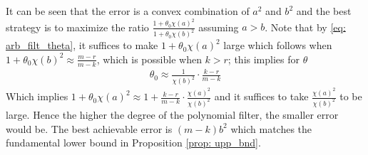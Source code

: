 \documentclass[conference]{IEEEtran}
\begin{document}
It can be seen that the error is a convex combination of $a^2$ and $b^2$ and the best strategy is to maximize the ratio $\frac{1 + \theta_0 \chi(a)^2}{1 + \theta_0 \chi(b)^2}$ assuming $a > b$. Note that by \eqref{eq: arb_filt_theta}, it suffices to make $1 + \theta_0 \chi(a)^2$ large which follows when $1 + \theta_0 \chi(b)^2 \approx \frac{m-r}{m-k}$, which is possible when $k > r$; this implies for $\theta$
\begin{align*}
    \theta_0 \approx \frac{1}{\chi(b)^2} \cdot \frac{k-r}{m-k}
\end{align*}
Which implies $1 + \theta_0 \chi(a)^2 \approx 1 + \frac{k-r}{m-k} \cdot \frac{\chi(a)^2}{\chi(b)^2} $ and it suffices to take $\frac{\chi(a)^2}{\chi(b)^2}$ to be large. Hence the higher the degree of the polynomial filter, the smaller error would be. The best achievable error is $(m-k) b^2$ which matches the fundamental lower bound in Proposition \ref{prop: upp_bnd}.
\end{document}
